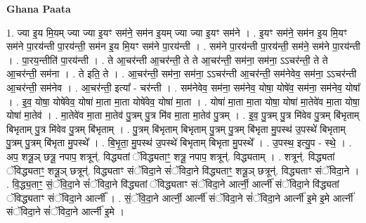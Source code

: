 \documentclass[17pt]{extarticle}
\begin{document}
\textbf{Ghana Paata } \newline

1. ज्या इ॒य मि॒यम् ज्या ज्या इ॒यꣳ सम॑ने॒ सम॑न इ॒यम् ज्या ज्या इ॒यꣳ सम॑ने । . इ॒यꣳ सम॑ने॒ सम॑न इ॒य मि॒यꣳ सम॑ने पा॒रय॑न्ती पा॒रय॑न्ती॒ सम॑न इ॒य मि॒यꣳ सम॑ने पा॒रय॑न्ती । . सम॑ने पा॒रय॑न्ती पा॒रय॑न्ती॒ सम॑ने॒ सम॑ने पा॒रय॑न्ती । . पा॒रय॒न्तीति॑ पा॒रय॑न्ती । . ते आ॒चर॑न्ती आ॒चर॑न्ती॒ ते ते आ॒चर॑न्ती॒ सम॑ना॒ सम॑ना॒ ऽऽचर॑न्ती॒ ते ते आ॒चर॑न्ती॒ सम॑ना । . ते इति॒ ते । . आ॒चर॑न्ती॒ सम॑ना॒ सम॑ना॒ ऽऽचर॑न्ती आ॒चर॑न्ती॒ सम॑नेवेव॒ सम॑ना॒ ऽऽचर॑न्ती आ॒चर॑न्ती॒ सम॑नेव । . आ॒चर॑न्ती॒ इत्या᳚ - चर॑न्ती । . सम॑नेवेव॒ सम॑ना॒ सम॑नेव॒ योषा॒ योषे॑व॒ सम॑ना॒ सम॑नेव॒ योषा᳚ । . इ॒व॒ योषा॒ योषे॑वेव॒ योषा॑ मा॒ता मा॒ता योषे॑वेव॒ योषा॑ मा॒ता । . योषा॑ मा॒ता मा॒ता योषा॒ योषा॑ मा॒तेवे॑व मा॒ता योषा॒ योषा॑ मा॒तेव॑ । . मा॒तेवे॑व मा॒ता मा॒तेव॑ पु॒त्रम् पु॒त्र मि॑व मा॒ता मा॒तेव॑ पु॒त्रम् । . इ॒व॒ पु॒त्रम् पु॒त्र मि॑वेव पु॒त्रम् बि॑भृताम् बिभृताम् पु॒त्र मि॑वेव पु॒त्रम् बि॑भृताम् । . पु॒त्रम् बि॑भृताम् बिभृताम् पु॒त्रम् पु॒त्रम् बि॑भृता मु॒पस्थ॑ उ॒पस्थे॑ बिभृताम् पु॒त्रम् पु॒त्रम् बि॑भृता मु॒पस्थे᳚ । . बि॒भृ॒ता॒ मु॒पस्थ॑ उ॒पस्थे॑ बिभृताम् बिभृता मु॒पस्थे᳚ । . उ॒पस्थ॒ इत्यु॒प - स्थे॒ । . अप॒ शत्रू॒ञ् छत्रू॒ नपाप॒ शत्रून्॑. विद्ध्यतां ॅविद्ध्यताꣳ॒॒ शत्रू॒ नपाप॒ शत्रून्॑. विद्ध्यताम् । . शत्रून्॑. विद्ध्यतां ॅविद्ध्यताꣳ॒॒ शत्रू॒ञ् छत्रून्॑. विद्ध्यताꣳ संॅविदा॒ने सं॑ॅविदा॒ने वि॑द्ध्यताꣳ॒॒ शत्रू॒ञ् छत्रून्॑. विद्ध्यताꣳ संॅविदा॒ने । . वि॒द्ध्य॒ताꣳ॒॒ सं॒ॅवि॒दा॒ने सं॑ॅविदा॒ने वि॑द्ध्यतां ॅविद्ध्यताꣳ संॅविदा॒ने आर्त्नी॒ आर्त्नी॑ संॅविदा॒ने वि॑द्ध्यतां ॅविद्ध्यताꣳ संॅविदा॒ने आर्त्नी᳚ । . सं॒ॅवि॒दा॒ने आर्त्नी॒ आर्त्नी॑ संॅविदा॒ने सं॑ॅविदा॒ने आर्त्नी॑ इ॒मे इ॒मे आर्त्नी॑ संॅविदा॒ने सं॑ॅविदा॒ने आर्त्नी॑ इ॒मे । \newline
\end{document}
